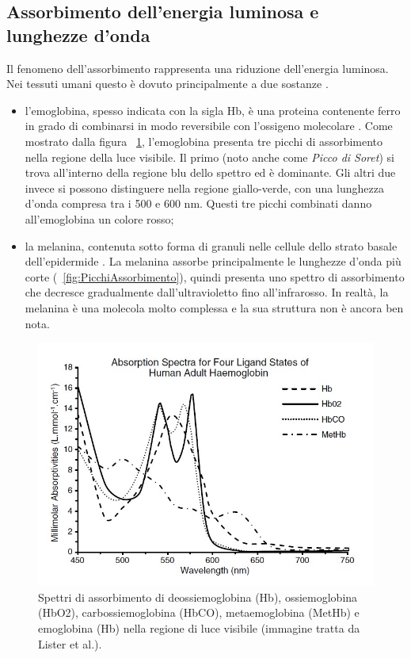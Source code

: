 \subsection{Assorbimento dell'energia luminosa e lunghezze d'onda}
Il fenomeno dell'assorbimento rappresenta una riduzione dell'energia luminosa. Nei tessuti umani questo è dovuto principalmente a due sostanze \cite{Lister2012}.
\begin{itemize}
\item l'emoglobina, spesso indicata con la sigla Hb, è una proteina contenente ferro in grado di combinarsi in modo reversibile con l’ossigeno molecolare \cite{SilverthornDeeUnglaub2020Fu:u}. Come mostrato dalla figura \Fig~\ref{fig:AssorbimentoEmolglobina}, l'emoglobina presenta tre picchi di assorbimento nella regione della luce visibile. Il primo (noto anche come \textit{Picco di Soret}) si trova all'interno della regione blu dello spettro ed è dominante. Gli altri due invece si possono distinguere nella regione giallo-verde, con una lunghezza d'onda compresa tra i 500 e 600 nm. Questi tre picchi combinati danno all'emoglobina un colore rosso;
\item la melanina, contenuta sotto forma di granuli nelle cellule dello strato basale dell’epidermide \cite{SilverthornDeeUnglaub2020Fu:u}. La melanina assorbe principalmente le lunghezze d'onda più corte (\Fig~\ref{fig:PicchiAssorbimento}), quindi presenta uno spettro di assorbimento che decresce gradualmente dall'ultravioletto fino all'infrarosso. In realtà, la melanina è una molecola molto complessa e la sua struttura non è ancora ben nota.
\end{itemize}
\begin{figure}[b]
	\centering
	\includegraphics[width=0.8\linewidth]{ImageFiles/Fotopletismografia/AssorbimentoEmolglobina}
	\caption{Spettri di assorbimento di deossiemoglobina (Hb), ossiemoglobina (HbO2), carbossiemoglobina (HbCO), metaemoglobina (MetHb) e emoglobina (Hb) nella regione di luce visibile (immagine tratta da Lister et al.\cite{Lister2012}).}
	\label{fig:AssorbimentoEmolglobina}
\end{figure}
